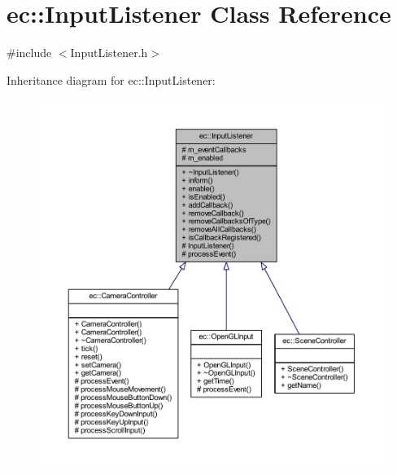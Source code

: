 \hypertarget{classec_1_1_input_listener}{}\section{ec\+:\+:Input\+Listener Class Reference}
\label{classec_1_1_input_listener}


{\ttfamily \#include $<$Input\+Listener.\+h$>$}



Inheritance diagram for ec\+:\+:Input\+Listener\+:\nopagebreak
\begin{figure}[H]
\begin{center}
\leavevmode
\includegraphics[width=350pt]{classec_1_1_input_listener__inherit__graph}
\end{center}
\end{figure}


